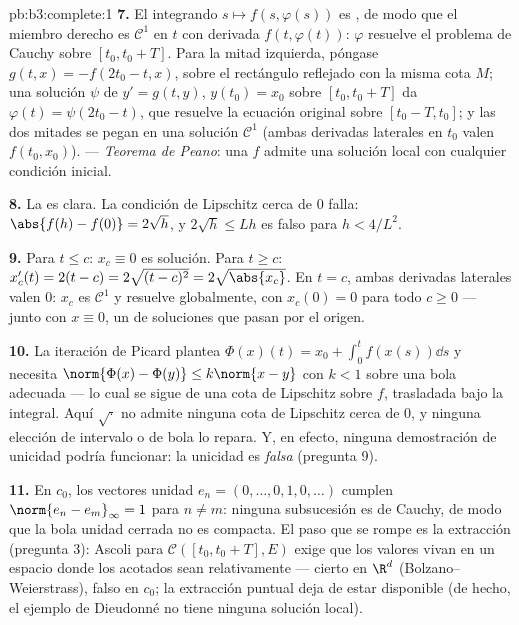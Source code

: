 \begin{solution}{pb:b3:complete:1}
\textbf{7.} El integrando $s \mapsto f(s, \varphi(s))$ es
, de modo que el miembro
derecho es $\mathcal C^1$ en $t$ con derivada $f(t, \varphi(t))$:
$\varphi$ resuelve el problema de Cauchy sobre $[t_0, t_0 + T]$. Para la
mitad izquierda, póngase $g(t, x) =
-f(2t_0 - t, x)$,  sobre el
rectángulo reflejado con la misma cota $M$; una solución $\psi$ de
$y' = g(t,y)$, $y(t_0) = x_0$ sobre $[t_0, t_0 + T]$ da $\varphi(t) =
\psi(2t_0 - t)$, que resuelve la ecuación original sobre $[t_0 - T,
t_0]$; y las dos mitades se pegan en una solución $\mathcal C^1$ (ambas
derivadas laterales en $t_0$ valen $f(t_0, x_0)$). --- \emph{Teorema de
Peano}: una $f$  admite una
solución local con cualquier condición inicial.

\textbf{8.} La  es
clara. La condición de Lipschitz cerca de $0$ falla:
$\abs{f(h) - f(0)} = 2\sqrt h$, y $2\sqrt h \leq L h$ es falso para
$h < 4/L^2$.

\textbf{9.} Para $t \leq c$: $x_c \equiv 0$ es solución. Para $t \geq
c$: $x_c'(t) = 2(t - c) = 2\sqrt{(t-c)^2} = 2\sqrt{\abs{x_c}}$. En
$t = c$, ambas derivadas laterales valen $0$: $x_c$ es $\mathcal C^1$ y
resuelve globalmente, con $x_c(0) = 0$ para todo $c \geq 0$ --- junto
con $x \equiv 0$, un  de soluciones que pasan por el origen.

\textbf{10.} La iteración de Picard plantea $\Phi(x)(t) = x_0 +
\int_0^t f(x(s))\dd s$ y necesita $\norm{\Phi(x) - \Phi(y)}
\leq k\norm{x - y}$ con $k < 1$ sobre una bola adecuada --- lo cual se
sigue de una cota de Lipschitz sobre $f$, trasladada bajo la integral.
Aquí $\sqrt\cdot$ no admite ninguna cota de Lipschitz cerca de $0$, y
ninguna elección de intervalo o de bola lo repara. Y, en efecto, ninguna
demostración de unicidad podría funcionar: la unicidad es \emph{falsa}
(pregunta 9).

\textbf{11.} En $c_0$, los vectores unidad $e_n = (0, \dots, 0, 1,
0, \dots)$ cumplen $\norm{e_n - e_m}_\infty = 1$ para $n \neq
m$: ninguna subsucesión es de Cauchy, de modo que la bola unidad cerrada
no es compacta. El paso que se rompe
es la extracción (pregunta 3): Ascoli para $\mathcal C([t_0, t_0+T], E)$
exige que los valores vivan en un espacio donde los acotados sean
relativamente  --- cierto en
$\R^d$ (Bolzano--Weierstrass), falso en $c_0$; la extracción puntual
deja de estar disponible (de hecho, el ejemplo de Dieudonné no tiene
ninguna solución local).


\end{solution}
